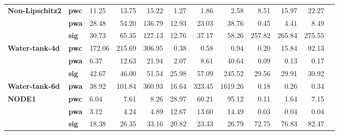 \begin{tabular}{@{} lll rrr rrr rrr @{}}
    \textbf{Non-Lipschitz2} & \textbf{pwc}      & 11.25                     & 13.75                     & 15.22                     & 1.27   & 1.86                      & 2.58    & 8.51   & 15.97                     & 22.27  \\
                            & \textbf{pwa}      & 28.48                     & 54.20                     & 136.79                    & 12.93  & 23.03                     & 38.76   & 0.45   & 4.41                      & 8.49   \\
                            & \textbf{sig}      & 30.73                     & 65.35                     & 127.13                    & 12.76  & 37.17                     & 58.26   & 257.82 & 265.84                    & 275.55 \\
    \midrule
    \textbf{Water-tank-4d}  & \textbf{pwc}      & 172.06                    & 215.69                    & 306.95                    & 0.38   & 0.58                      & 0.94    & 0.20   & 15.84                     & 92.13  \\
                            & \textbf{pwa}      & 6.37                      & 12.63                     & 21.94                     & 2.07   & 8.61                      & 40.64   & 0.09   & 0.13                      & 0.17   \\
                            & \textbf{sig}      & 42.67                     & 46.00                     & 51.54                     & 25.98  & 57.09                     & 245.52  & 29.56  & 29.91                     & 30.92  \\
    \midrule
    \textbf{Water-tank-6d}  & \textbf{pwa}      & 38.92                     & 101.84                    & 360.93                    & 16.64  & 323.45                    & 1619.26 & 0.18   & 0.26                      & 0.34   \\
    \midrule
    \textbf{NODE1}          & \textbf{pwc}      & 6.04                      & 7.61                      & 8.26                      & 28.97  & 60.21                     & 95.12   & 0.11   & 1.64                      & 7.15   \\
                            & \textbf{pwa}      & 3.12                      & 4.24                      & 4.89                      & 12.67  & 13.60                     & 14.49   & 0.03   & 0.04                      & 0.04   \\
                            & \textbf{sig}      & 18.38                     & 26.35                     & 33.16                     & 20.82  & 23.33                     & 26.79   & 72.75  & 76.83                     & 82.47  \\
    \bottomrule
\end{tabular}
